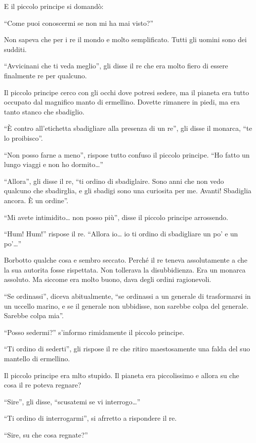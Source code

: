 \documentclass[11pt]{scrbook}
\begin{document}
E il piccolo principe si domandò:

``Come puoi conoscermi se non mi ha mai visto?''

Non sapeva che per i re il mondo e molto semplificato. Tutti gli uomini
sono dei sudditi.

``Avvicinani che ti veda meglio'', gli disse il re che era molto fiero
di essere finalmente re per qualcuno.

Il piccolo principe cerco con gli occhi dove potresi sedere, ma il
pianeta era tutto occupato dal magnifico manto di ermellino. Dovette
rimanere in piedi, ma era tanto stanco che sbadiglio.

``È contro all'etichetta sbadigliare alla presenza di un re'', gli disse
il monarca, ``te lo proibisco''.

``Non posso farne a meno'', rispose tutto confuso il piccolo principe.
``Ho fatto un lungo viaggi e non ho dormito\ldots{}''

``Allora'', gli disse il re, ``ti ordino di sbadiglaire. Sono anni che
non vedo qualcuno che sbadirglia, e gli sbadigi sono una curiosita per
me. Avanti! Sbadiglia ancora. È un ordine''.

``Mi avete intimidito\ldots{} non posso più'', disse il piccolo principe
arrossendo.

``Hum! Hum!'' rispose il re. ``Allora io\ldots{} io ti ordino di
sbadigliare un po' e un po'\ldots{}''

Borbotto qualche cosa e sembro seccato. Perché il re teneva
assolutamente a che la sua autorita fosse rispettata. Non tollerava la
disubbidienza. Era un monarca assoluto. Ma siccome era molto buono, dava
degli ordini ragionevoli.

``Se ordinassi'', diceva abitualmente, ``se ordinassi a un generale di
trasformarsi in un uccello marino, e se il generale non ubbidisse, non
sarebbe colpa del generale. Sarebbe colpa mia''.

``Posso sedermi?'' s'informo rimidamente il piccolo principe.

``Ti ordino di sederti'', gli rispose il re che ritiro maestosamente una
falda del suo mantello di ermellino.

Il piccolo principe era mlto stupido. Il pianeta era piccolissimo e
allora su che cosa il re poteva regnare?

``Sire'', gli disse, ``scusatemi se vi interrogo\ldots{}''

``Ti ordino di interrogarmi'', si afrretto a rispondere il re.

``Sire, su che cosa regnate?''
\end{document}

